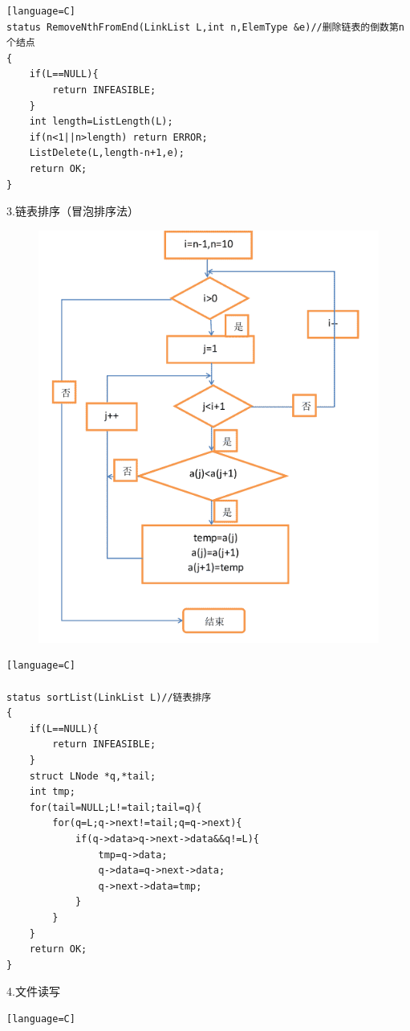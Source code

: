 \documentclass[supercite]{Experimental_Report}
\theoremstyle{definition}
\begin{document}
\begin{sloppypar}
\begin{lstlisting}[breaklines][language=C]
status RemoveNthFromEnd(LinkList L,int n,ElemType &e)//删除链表的倒数第n个结点
{
	if(L==NULL){
        return INFEASIBLE;
	}
	int length=ListLength(L);
	if(n<1||n>length) return ERROR;
	ListDelete(L,length-n+1,e);
	return OK;
}
\end{lstlisting}
3.链表排序（冒泡排序法）
\begin{figure}[H]
	\includegraphics[width=16cm]{pic2//maopao.png}
\end{figure} 
\begin{lstlisting}[breaklines][language=C]

status sortList(LinkList L)//链表排序
{
	if(L==NULL){
        return INFEASIBLE;
	}
	struct LNode *q,*tail;
	int tmp;
	for(tail=NULL;L!=tail;tail=q){
		for(q=L;q->next!=tail;q=q->next){
			if(q->data>q->next->data&&q!=L){
				tmp=q->data;
				q->data=q->next->data;
				q->next->data=tmp;
			}
		}
	}
	return OK;	
}

\end{lstlisting}

4.文件读写

\begin{lstlisting}[breaklines][language=C]


\end{lstlisting}
\end{sloppypar}
\end{document}
